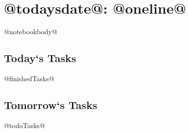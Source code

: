 \section[@oneline@]{@todaysdate@: @oneline@}

@notebookbody@

\subsection{Today`s Tasks}
@finishedTasks@
\subsection{Tomorrow`s Tasks}
@todoTasks@